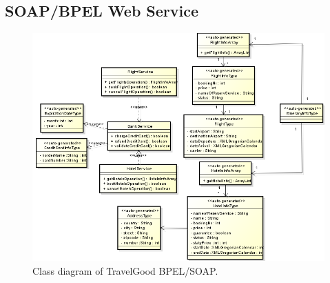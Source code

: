 \subsection{SOAP/BPEL Web Service}

\begin{figure}[H]
\centering
\includegraphics[width=\textwidth]{images/BPEL-SOAP}
\caption{Class diagram of TravelGood BPEL/SOAP.}
\label{classdiagramBPEL}
\end{figure}